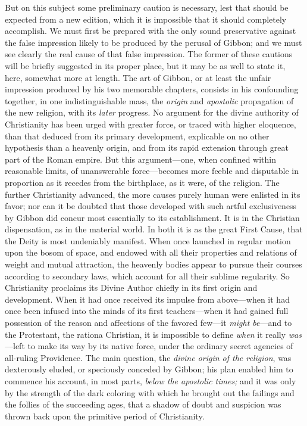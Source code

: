 But on this subject some preliminary caution is necessary, lest that should be expected from a new edition, which it is impossible that it should completely accomplish. We must first be prepared with the only sound preservative against the false impression likely to be produced by the perusal of Gibbon; and we must see clearly the real cause of that false impression. The former of these cautions will be briefly suggested in its proper place, but it may be as well to state it, here, somewhat more at length. The art of Gibbon, or at least the unfair impression produced by his two memorable chapters, consists in his confounding together, in one indistinguishable mass, the \textit{origin} and \textit{apostolic} propagation of the new religion, with its \textit{later} progress. No argument for the divine authority of Christianity has been urged with greater force, or traced with higher eloquence, than that deduced from its primary development, explicable on no other hypothesis than a heavenly origin, and from its rapid extension through great part of the Roman empire. But this argument—one, when confined within reasonable limits, of unanswerable force—becomes more feeble and disputable in proportion as it recedes from the birthplace, as it were, of the religion. The further Christianity advanced, the more causes purely human were enlisted in its favor; nor can it be doubted that those developed with such artful exclusiveness by Gibbon did concur most essentially to its establishment. It is in the Christian dispensation, as in the material world. In both it is as the great First Cause, that the Deity is most undeniably manifest. When once launched in regular motion upon the bosom of space, and endowed with all their properties and relations of weight and mutual attraction, the heavenly bodies appear to pursue their courses according to secondary laws, which account for all their sublime regularity. So Christianity proclaims its Divine Author chiefly in its first origin and development. When it had once received its impulse from above—when it had once been infused into the minds of its first teachers—when it had gained full possession of the reason and affections of the favored few—it \textit{might be}—and to the Protestant, the rationa Christian, it is impossible to define \textit{when} it really \textit{was}—left to make its way by its native force, under the ordinary secret agencies of all-ruling Providence. The main question, the \textit{divine origin of the religion}, was dexterously eluded, or speciously conceded by Gibbon; his plan enabled him to commence his account, in most parts, \textit{below the apostolic times;} and it was only by the strength of the dark coloring with which he brought out the failings and the follies of the succeeding ages, that a shadow of doubt and suspicion was thrown back upon the primitive period of Christianity.

